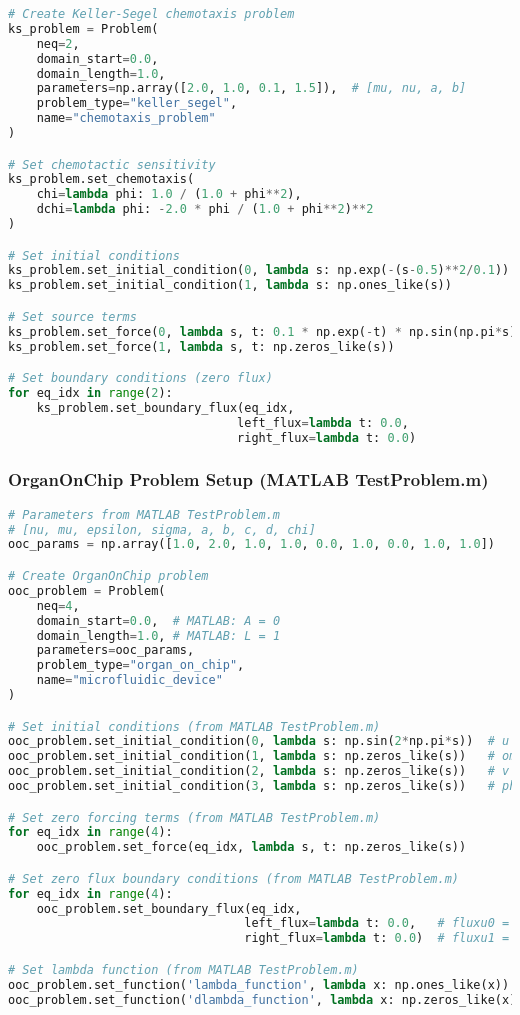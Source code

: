\begin{lstlisting}[language=Python, caption=Complete Keller-Segel Setup]
# Create Keller-Segel chemotaxis problem
ks_problem = Problem(
    neq=2,
    domain_start=0.0,
    domain_length=1.0,
    parameters=np.array([2.0, 1.0, 0.1, 1.5]),  # [mu, nu, a, b]
    problem_type="keller_segel",
    name="chemotaxis_problem"
)

# Set chemotactic sensitivity
ks_problem.set_chemotaxis(
    chi=lambda phi: 1.0 / (1.0 + phi**2),
    dchi=lambda phi: -2.0 * phi / (1.0 + phi**2)**2
)

# Set initial conditions
ks_problem.set_initial_condition(0, lambda s: np.exp(-(s-0.5)**2/0.1))  # u
ks_problem.set_initial_condition(1, lambda s: np.ones_like(s))          # phi

# Set source terms
ks_problem.set_force(0, lambda s, t: 0.1 * np.exp(-t) * np.sin(np.pi*s))
ks_problem.set_force(1, lambda s, t: np.zeros_like(s))

# Set boundary conditions (zero flux)
for eq_idx in range(2):
    ks_problem.set_boundary_flux(eq_idx, 
                                left_flux=lambda t: 0.0,
                                right_flux=lambda t: 0.0)
\end{lstlisting}

\subsubsection{OrganOnChip Problem Setup (MATLAB TestProblem.m)}

\begin{lstlisting}[language=Python, caption=Complete OrganOnChip Setup]
# Parameters from MATLAB TestProblem.m
# [nu, mu, epsilon, sigma, a, b, c, d, chi]
ooc_params = np.array([1.0, 2.0, 1.0, 1.0, 0.0, 1.0, 0.0, 1.0, 1.0])

# Create OrganOnChip problem
ooc_problem = Problem(
    neq=4,
    domain_start=0.0,  # MATLAB: A = 0
    domain_length=1.0, # MATLAB: L = 1
    parameters=ooc_params,
    problem_type="organ_on_chip",
    name="microfluidic_device"
)

# Set initial conditions (from MATLAB TestProblem.m)
ooc_problem.set_initial_condition(0, lambda s: np.sin(2*np.pi*s))  # u
ooc_problem.set_initial_condition(1, lambda s: np.zeros_like(s))   # omega
ooc_problem.set_initial_condition(2, lambda s: np.zeros_like(s))   # v
ooc_problem.set_initial_condition(3, lambda s: np.zeros_like(s))   # phi

# Set zero forcing terms (from MATLAB TestProblem.m)
for eq_idx in range(4):
    ooc_problem.set_force(eq_idx, lambda s, t: np.zeros_like(s))

# Set zero flux boundary conditions (from MATLAB TestProblem.m)
for eq_idx in range(4):
    ooc_problem.set_boundary_flux(eq_idx,
                                 left_flux=lambda t: 0.0,   # fluxu0 = 0
                                 right_flux=lambda t: 0.0)  # fluxu1 = 0

# Set lambda function (from MATLAB TestProblem.m)
ooc_problem.set_function('lambda_function', lambda x: np.ones_like(x))
ooc_problem.set_function('dlambda_function', lambda x: np.zeros_like(x))
\end{lstlisting}


